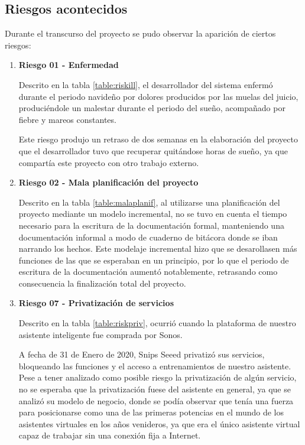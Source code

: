     \newpage
    \subsection{Riesgos acontecidos}
    
        Durante el transcurso del proyecto se pudo observar la aparición de ciertos riesgos:
        
        \begin{enumerate}
        
        \item \textbf{Riesgo 01 - Enfermedad}
        
        Descrito en la tabla \ref{table:riskill}, el desarrollador del sistema enfermó durante el periodo navideño por dolores producidos por las muelas del juicio, produciéndole un malestar durante el periodo del sueño, acompañado por fiebre y mareos constantes.
        
        Este riesgo produjo un retraso de dos semanas en la elaboración del proyecto que el desarrollador tuvo que recuperar quitándose horas de sueño, ya que compartía este proyecto con otro trabajo externo.
        
        \item \textbf{Riesgo 02 - Mala planificación del proyecto}
        
        Descrito en la tabla \ref{table:malaplanif}, al utilizarse una planificación del proyecto mediante un modelo incremental, no se tuvo en cuenta el tiempo necesario para la escritura de la documentación formal, manteniendo una documentación informal a modo de cuaderno de bitácora donde se iban narrando los hechos.
        Este modelaje incremental hizo que se desarollasen más funciones de las que se esperaban en un principio, por lo que el periodo de escritura de la documentación aumentó notablemente, retrasando como consecuencia la finalización total del proyecto.
        
            \item \textbf{Riesgo 07 - Privatización de servicios}
            
        Descrito en la tabla \ref{table:riskpriv}, ocurrió cuando la plataforma de nuestro asistente inteligente fue comprada por Sonos. 
        
        A fecha de 31 de Enero de 2020, Snips Seeed privatizó sus servicios, bloqueando las funciones y el acceso a entrenamientos de nuestro asistente. Pese a tener analizado como posible riesgo la privatización de algún servicio, no se esperaba que la privatización fuese del asistente en general, ya que se analizó su modelo de negocio, donde se podía observar que tenía una fuerza para posicionarse como una de las primeras potencias en el mundo de los asistentes virtuales en los años venideros, ya que era el único asistente virtual capaz de trabajar sin una conexión fija a Internet. 
        

\end{enumerate}
